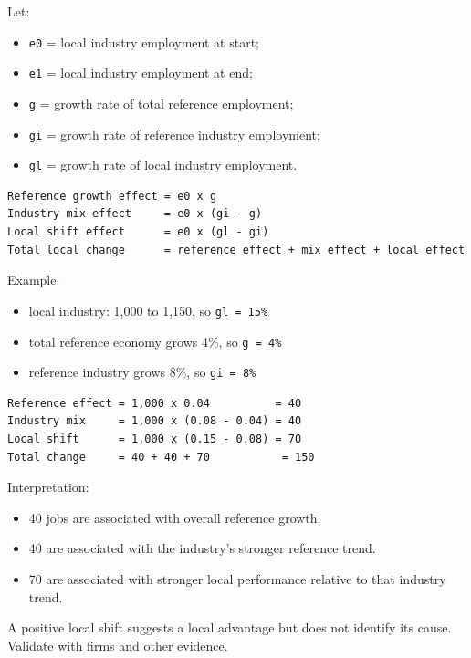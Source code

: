 \documentclass[11pt,letterpaper,oneside,openany]{book}
\begin{document}
Let:


\begin{itemize}
\item \texttt{e0} = local industry employment at start;
\item \texttt{e1} = local industry employment at end;
\item \texttt{g} = growth rate of total reference employment;
\item \texttt{gi} = growth rate of reference industry employment;
\item \texttt{gl} = growth rate of local industry employment.
\end{itemize}


\begin{Verbatim}[fontsize=\small,breaklines=true,breakanywhere=true,frame=single,framesep=2mm]
Reference growth effect = e0 x g
Industry mix effect     = e0 x (gi - g)
Local shift effect      = e0 x (gl - gi)
Total local change      = reference effect + mix effect + local effect
\end{Verbatim}

Example:


\begin{itemize}
\item local industry: 1,000 to 1,150, so \texttt{gl = 15\%}
\item total reference economy grows 4\%, so \texttt{g = 4\%}
\item reference industry grows 8\%, so \texttt{gi = 8\%}
\end{itemize}


\begin{Verbatim}[fontsize=\small,breaklines=true,breakanywhere=true,frame=single,framesep=2mm]
Reference effect = 1,000 x 0.04          = 40
Industry mix     = 1,000 x (0.08 - 0.04) = 40
Local shift      = 1,000 x (0.15 - 0.08) = 70
Total change     = 40 + 40 + 70           = 150
\end{Verbatim}

Interpretation:


\begin{itemize}
\item 40 jobs are associated with overall reference growth.
\item 40 are associated with the industry's stronger reference trend.
\item 70 are associated with stronger local performance relative to that industry trend.
\end{itemize}


A positive local shift suggests a local advantage but does not identify its cause. Validate with firms and other evidence.
\end{document}
